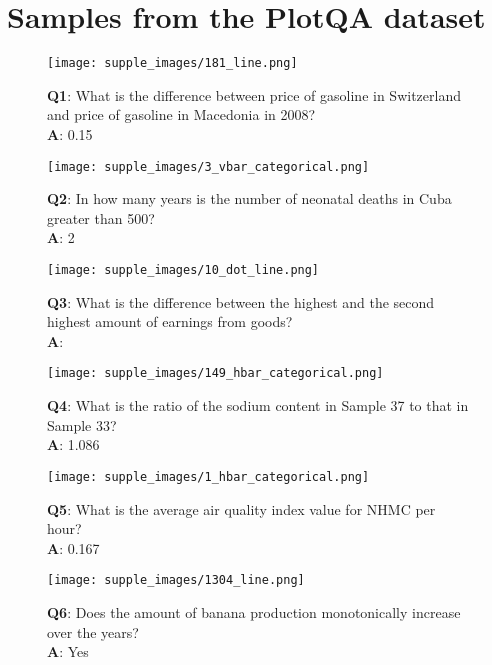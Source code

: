 \documentclass[10pt,twocolumn,letterpaper]{article}
\begin{document}
\section{Samples from the PlotQA dataset}
\label{plot_samples}
\begin{figure*}
\centering
\begin{subfigure}{.45\textwidth}
\centering
\texttt{[image: supple\_images/181\_line.png]}
\caption*{\textbf{Q1}: What is the difference between price of gasoline in Switzerland and price of gasoline in Macedonia in 2008?\\
\textbf{A}: 0.15}
\end{subfigure}
\hspace{0.2cm}
\begin{subfigure}{.45\textwidth}
\centering
\texttt{[image: supple\_images/3\_vbar\_categorical.png]}
\caption*{\textbf{Q2}: In how many years is the number of neonatal deaths in Cuba greater than 500? \\
\textbf{A}: 2
}
\end{subfigure}
\begin{subfigure}{.45\textwidth}
\centering
\texttt{[image: supple\_images/10\_dot\_line.png]}
\caption*{
\textbf{Q3}:  What is the difference between the highest and the second highest amount of earnings from goods?\\
\textbf{A}: }
\end{subfigure}
\hspace{0.2cm}
\begin{subfigure}{.45\textwidth}
\centering
\texttt{[image: supple\_images/149\_hbar\_categorical.png]}
\caption*{\textbf{Q4}: What is the ratio of the sodium content in Sample 37 to that in Sample 33?\\
\textbf{A}: 1.086
}
\end{subfigure}
\begin{subfigure}{.45\textwidth}
\texttt{[image: supple\_images/1\_hbar\_categorical.png]}
\caption*{
\textbf{Q5}: What is the average air quality index value for NHMC per hour?\\
\textbf{A}: 0.167
}
\end{subfigure}
\hspace{0.2cm}
\begin{subfigure}{.45\textwidth}
\texttt{[image: supple\_images/1304\_line.png]}
\caption*{\textbf{Q6}: Does the amount of banana production monotonically increase over the years?\\
\textbf{A}: Yes
}
\end{subfigure}
\end{figure*}
\end{document}
